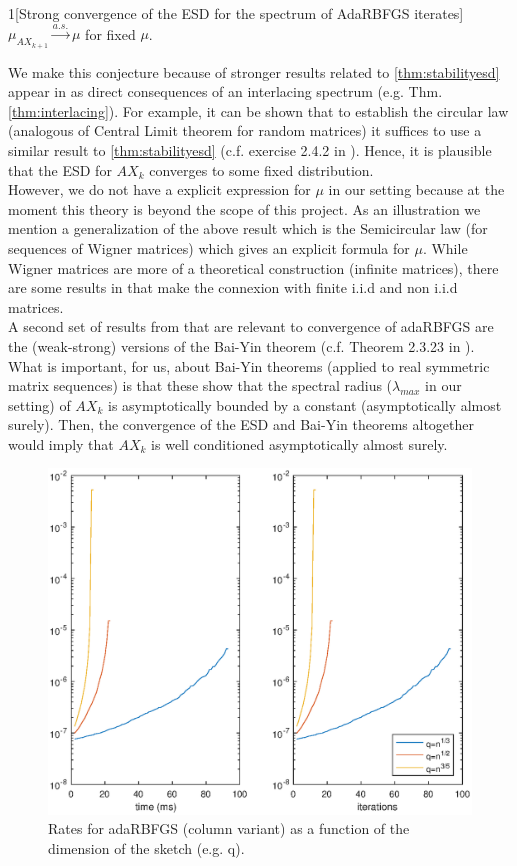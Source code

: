 \documentclass[12pt,conference,compsocconf]{IEEEtran}
\begin{document}
\begin{customconjecture}{1}[Strong convergence of the ESD for the spectrum of AdaRBFGS iterates]\label{conj:convergence}
	$\mu_{AX_{k+1}} \overset{a.s.}{\to} \mu$ for fixed $\mu$.
\end{customconjecture}
 
We make this conjecture because of stronger results related to \ref{thm:stabilityesd} appear in \cite{Tao} as direct consequences of an interlacing spectrum (e.g. Thm. \ref{thm:interlacing}). For example, it can be shown that to establish the circular law (analogous of Central Limit theorem for random matrices) it suffices to use a similar result to \ref{thm:stabilityesd} (c.f. exercise 2.4.2 in \cite{Tao}). Hence, it is plausible that the ESD for $AX_k$ converges to some fixed distribution.\\
However, we do not have a explicit expression for $\mu$ in our setting because at the moment this theory is beyond the scope of this project. As an illustration we mention a generalization of the above result which is the Semicircular law (for sequences of Wigner matrices) which gives an explicit formula for $\mu$. While Wigner matrices are more of a theoretical construction (infinite matrices), there are some results in \cite{Tao} that make the connexion with finite i.i.d and non i.i.d matrices.\\
A second set of results from \cite{Tao} that are relevant to convergence of adaRBFGS are the (weak-strong) versions of the Bai-Yin theorem (c.f. Theorem 2.3.23 in \cite{Tao}). What is important, for us, about Bai-Yin theorems (applied to real symmetric matrix sequences) is that these show that the spectral radius ($\lambda_{max}$ in our setting) of $AX_k$ is asymptotically bounded by a constant (asymptotically almost surely). Then, the convergence of the ESD and Bai-Yin theorems altogether would imply that $AX_k$ is well conditioned asymptotically almost surely.
\begin{figure}[H]
  \centering
  \includegraphics[height=0.7\columnwidth,width=1.1\columnwidth]{ratedim.eps}   \vspace{-2mm}
  \caption{Rates for adaRBFGS (column variant) as a function of the dimension of the sketch (e.g. q). \label{fig:ratedim}}  
\end{figure}
\end{document}

